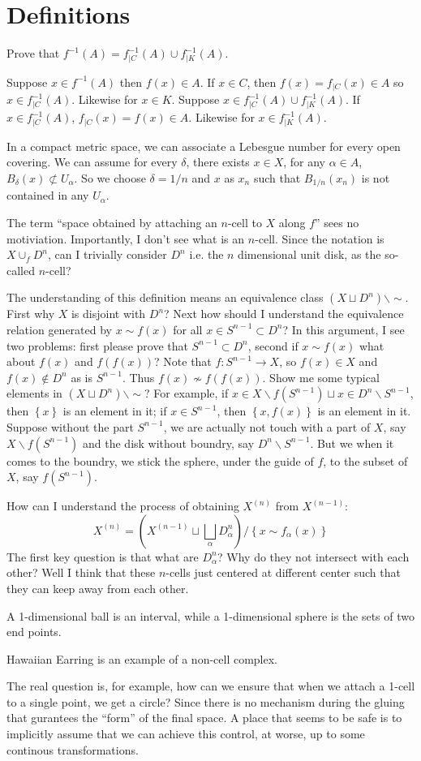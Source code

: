 \section{Definitions}
Prove that $f^{-1}(A)=f_{|C}^{-1}(A)\cup f_{|K}^{-1}(A)$.

\noindent Suppose $x\in f^{-1}(A)$ then $f(x)\in A$. If $x\in C$, then $f(x)=f_{|C}(x)\in A$ so $x\in f^{-1}_{|C}(A)$. Likewise for $x\in K$. Suppose $x\in f_{|C}^{-1}(A)\cup f_{|K}^{-1}(A)$. If $x\in f_{|C}^{-1}(A)$, $f_{|C}(x)=f(x)\in A$. Likewise for $x\in f_{|K}^{-1}(A)$.

In a compact metric space, we can associate a Lebesgue number for every open covering. We can assume for every $\delta$, there exists $x\in X$, for any $\alpha\in A$, $B_{\delta}(x)\not\subset U_{\alpha}$. So we choose $\delta=1/n$ and $x$ as $x_n$ such that $B_{1/n}(x_n)$ is not contained in any $U_{\alpha}$.

The term “space obtained by attaching an $n$-cell to $X$ along $f$”  sees no motiviation. Importantly, I don't see what is an $n$-cell. Since the notation is $X\cup_f D^n$, can I trivially consider $D^n$ i.e. the $n$ dimensional unit disk, as the so-called $n$-cell?

The understanding of this definition means an equivalence class $(X\sqcup D^n)\backslash \sim$. First why $X$ is disjoint with $D^n$? Next how should I understand the equivalence relation generated by $x\sim f(x)$ for all $x\in S^{n-1}\subset D^n$? In this argument, I see two problems: first please prove that $S^{n-1}\subset D^n$, second if $x\sim f(x)$ what about $f(x)$ and $f(f(x))$? Note that $f:S^{n-1}\longrightarrow X$, so $f(x)\in X$ and $f(x)\not \in D^{n}$ as is $S^{n-1}$. Thus $f(x)\not \sim f(f(x))$. Show me some typical elements in $(X\sqcup D^n)\backslash \sim$? For example, if $x\in X\backslash f(S^{n-1})\sqcup x\in D^n\backslash S^{n-1}$, then $\left\{x\right\}$ is an element in it; if $x\in S^{n-1}$, then $\left\{x,f(x)\right\}$ is an element in it. Suppose without the part $S^{n-1}$, we are actually not touch with a part of $X$,  say $X\backslash f(S^{n-1})$ and the disk without boundry, say $D^n\backslash S^{n-1}$. But we when it comes to the boundry, we stick the sphere, under the guide of $f$, to the subset of $X$, say $f(S^{n-1})$.

How can I understand the process of obtaining $X^{(n)}$ from $X^{(n-1)}$:
$$
X^{(n)}=\left(X^{(n-1)}\sqcup \bigsqcup_{\alpha}D_{\alpha}^{n}\right)\slash \left\{x\sim f_{\alpha}(x)\right\}
$$
The first key question is that what are $D_{\alpha}^n$? Why do they not intersect with each other? Well I think that these $n$-cells just centered at different center such that they can keep away from each other.

A 1-dimensional ball is an interval, while a 1-dimensional sphere is the sets of two end points.

Hawaiian Earring is an example of a non-cell complex.

The real question is, for example, how can we ensure that when we attach a 1-cell to a single point, we get a circle? Since there is no mechanism during the gluing that gurantees the “form” of the final space. A place that seems to be safe is to implicitly assume that we can achieve this control, at worse, up to some continous transformations.
